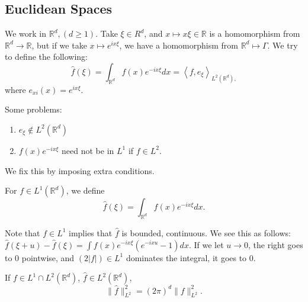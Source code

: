\documentclass[11pt]{scrartcl}
\newcommand{\R}{\mathbb{R}}
\let \hat \widehat
\newcommand{\<}{\langle}
\renewcommand{\>}{\rangle}
\begin{document}
\subsection{Euclidean Spaces}
We work in $\R^d, (d \ge 1)$.  Take $\xi \in R^d$, and $x \mapsto x\xi \in \R$ is a homomorphism from $\R^d \rightarrow \R$, but if we take $x \mapsto e^{ix\xi}$, we have a homomorphism from $\R^d\mapsto \Gamma$.  We try to define the following:
$$\hat{f}(\xi) = \int_{\R^d} f(x)e^{-ix\xi}dx = \left <f, e_{\xi}\right >_{L^2(\R^d),}$$
where $e_{xi}(x) = e^{ix\xi}$.

Some problems:
\begin{enumerate}
\item $e_\xi \not \in L^2(\R^d)$
\item $f(x)e^{-ix\xi}$ need not be in $L^1$ if $f \in L^2$.
\end{enumerate}
We fix this by imposing extra conditions.
\begin{definition} For $f \in L^1(\R^d)$, we define
$$\hat{f}(\xi) = \int_{\R^d} f(x)e^{-ix\xi}dx.$$
\end{definition} 

Note that $f \in L^1$ implies that $\hat{f}$ is bounded, continuous.  We see this as follows:
$\hat{f}(\xi + u) - \hat{f}(\xi) = \int f(x)e^{-ix\xi}(e^{-ixu}-1)dx$.  If we let $u \rightarrow 0$, the right goes to $0$ pointwise, and $(2|f|) \in L^1$ dominates the integral, it goes to $0$.  
\begin{proposition}If $f \in L^1 \cap L^2(\R^d)$, $\hat{f}\in L^2(\R^d)$, 
$$\|\hat{f}\|_{L^2}^2 = (2\pi)^d \|f\|_{L^2}^2.$$
\end{proposition}
\end{document}

